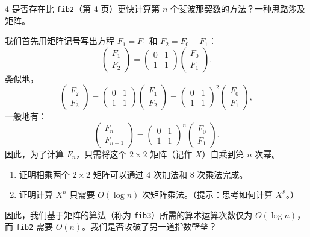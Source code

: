 \begin{exercise}{4}
是否存在比 \texttt{fib2}（第 4 页）更快计算第 $n$ 个斐波那契数的方法？一种思路涉及矩阵。

我们首先用矩阵记号写出方程 $F_1 = F_1$ 和 $F_2 = F_0 + F_1$：
\[
\begin{pmatrix} F_1 \\ F_2 \end{pmatrix} = \begin{pmatrix} 0 & 1 \\ 1 & 1 \end{pmatrix} \begin{pmatrix} F_0 \\ F_1 \end{pmatrix}.
\]
类似地，
\[
\begin{pmatrix} F_2 \\ F_3 \end{pmatrix} = \begin{pmatrix} 0 & 1 \\ 1 & 1 \end{pmatrix} \begin{pmatrix} F_1 \\ F_2 \end{pmatrix} = \begin{pmatrix} 0 & 1 \\ 1 & 1 \end{pmatrix}^2 \begin{pmatrix} F_0 \\ F_1 \end{pmatrix},
\]
一般地有：
\[
\begin{pmatrix} F_n \\ F_{n+1} \end{pmatrix} = \begin{pmatrix} 0 & 1 \\ 1 & 1 \end{pmatrix}^n \begin{pmatrix} F_0 \\ F_1 \end{pmatrix}.
\]
因此，为了计算 $F_n$，只需将这个 $2 \times 2$ 矩阵（记作 $X$）自乘到第 $n$ 次幂。
\begin{enumerate}
    \item[(a)] 证明相乘两个 $2 \times 2$ 矩阵可以通过 4 次加法和 8 次乘法完成。
    \item[(b)] 证明计算 $X^n$ 只需要 $O(\log n)$ 次矩阵乘法。（提示：思考如何计算 $X^8$。）
\end{enumerate}
因此，我们基于矩阵的算法（称为 \texttt{fib3}）所需的算术运算次数仅为 $O(\log n)$，而 \texttt{fib2} 需要 $O(n)$。我们是否攻破了另一道指数壁垒？


\end{exercise}
